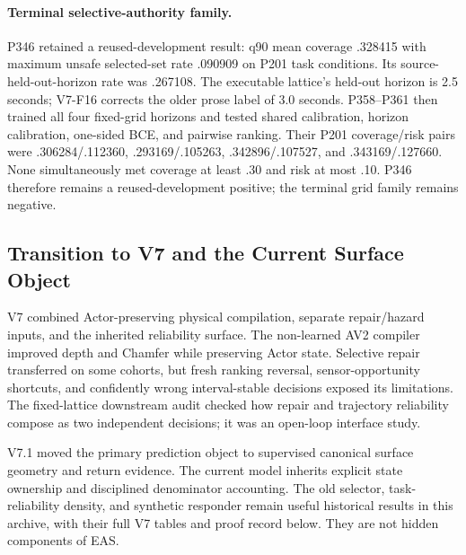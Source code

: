 \paragraph{Terminal selective-authority family.}
P346 retained a reused-development result: q90 mean coverage .328415 with maximum unsafe selected-set
rate .090909 on P201 task conditions. Its source-held-out-horizon rate was .267108.
The executable lattice's held-out horizon is 2.5 seconds; V7-F16 corrects the older prose label of 3.0 seconds.
P358--P361 then trained all four fixed-grid horizons and tested shared calibration, horizon calibration,
one-sided BCE, and pairwise ranking. Their P201 coverage/risk pairs were
.306284/.112360, .293169/.105263, .342896/.107527, and .343169/.127660.
None simultaneously met coverage at least .30 and risk at most .10.
P346 therefore remains a reused-development positive; the terminal grid family remains negative.

\subsection{Transition to V7 and the Current Surface Object}

V7 combined Actor-preserving physical compilation, separate repair/hazard inputs, and the inherited reliability
surface. The non-learned AV2 compiler improved depth and Chamfer while preserving Actor state.
Selective repair transferred on some cohorts, but fresh ranking reversal, sensor-opportunity shortcuts,
and confidently wrong interval-stable decisions exposed its limitations.
The fixed-lattice downstream audit checked how repair and trajectory reliability compose as two independent
decisions; it was an open-loop interface study.

V7.1 moved the primary prediction object to supervised canonical surface geometry and return evidence.
The current model inherits explicit state ownership and disciplined denominator accounting.
The old selector, task-reliability density, and synthetic responder remain useful historical results in
this archive, with their full V7 tables and proof record below. They are not hidden components of EAS.
